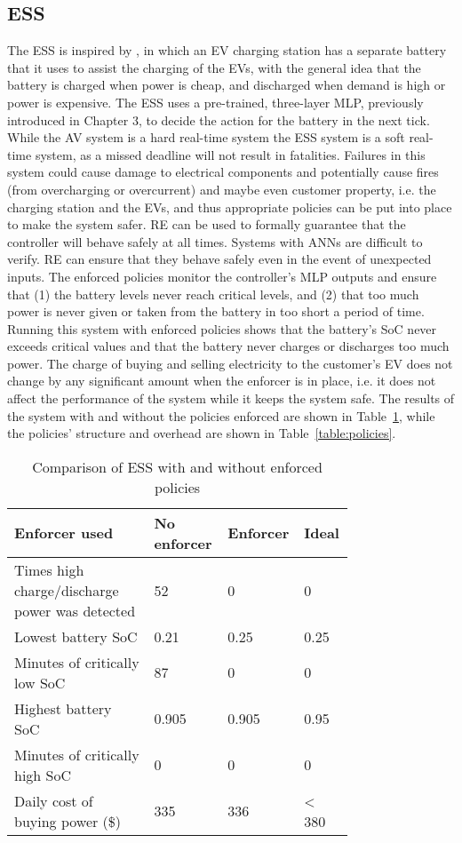 \subsection{\acf{ESS}} \label{sec:ess4}
The \ac{ESS} is inspired by \cite{chaudhari2017hybrid}, in which an \ac{EV} charging station has a separate battery that it uses to assist the charging of the \acp{EV}, with the general idea that the battery is charged when power is cheap, and discharged when demand is high or power is expensive.
The \ac{ESS} uses a pre-trained, three-layer \ac{MLP}, previously introduced in Chapter 3, to decide the action for the battery in the next tick.
While the \ac{AV} system is a hard real-time system the \ac{ESS} system is a soft real-time system, as a missed deadline will not result in fatalities.
Failures in this system could cause damage to electrical components and potentially cause fires (from overcharging or overcurrent) and maybe even customer property, i.e. the charging station and the \acp{EV}, and thus appropriate policies can be put into place to make the system safer.
\ac{RE} can be used to formally guarantee that the controller will behave safely at all times.
Systems with \acp{ANN} are difficult to verify.
\ac{RE} can ensure that they behave safely even in the event of unexpected inputs.
The enforced policies monitor the controller's \ac{MLP} outputs and ensure that (1) the battery levels never reach critical levels, and (2) that too much power is never given or taken from the battery in too short a period of time.
Running this system with enforced policies shows that the battery's \ac{SoC} never exceeds critical values and that the battery never charges or discharges too much power.
The charge of buying and selling electricity to the customer's \ac{EV} does not change by any significant amount when the enforcer is in place, i.e. it does not affect the performance of the system while it keeps the system safe.
The results of the system with and without the policies enforced are shown in Table~\ref{table:essres}, while the policies' structure and overhead are shown in Table~\ref{table:policies}.

\begin{table}[H]
	\centering
	\caption{Comparison of ESS with and without enforced policies}
	\label{table:essres}
	\begin{tabular}{|p{0.4\linewidth}|p{0.16\linewidth}|p{0.10\linewidth}|p{0.10\linewidth}|}
		\hline Enforcer used & No enforcer &  Enforcer & Ideal \\ \hline
		Times high charge/discharge power was detected & 52 & 0 & 0 \\ \hline      
		Lowest battery \ac{SoC} & 0.21 & 0.25 & 0.25 \\ \hline
		Minutes of critically low \ac{SoC} & 87 & 0 & 0 \\ \hline
		Highest battery \ac{SoC} & 0.905 & 0.905 & 0.95 \\ \hline
		Minutes of critically high \ac{SoC} & 0 & 0 & 0 \\ \hline
		Daily cost of buying power (\$) & 335 & 336 & < 380 \\ \hline 
	\end{tabular}
\end{table}

